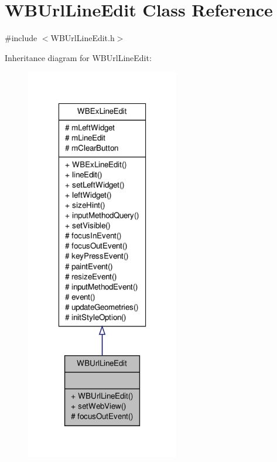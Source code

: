 \hypertarget{class_w_b_url_line_edit}{\section{W\-B\-Url\-Line\-Edit Class Reference}
\label{d6/d29/class_w_b_url_line_edit}
}


{\ttfamily \#include $<$W\-B\-Url\-Line\-Edit.\-h$>$}



Inheritance diagram for W\-B\-Url\-Line\-Edit\-:
\nopagebreak
\begin{figure}[H]
\begin{center}
\leavevmode
\includegraphics[width=190pt]{d6/dbd/class_w_b_url_line_edit__inherit__graph}
\end{center}
\end{figure}


